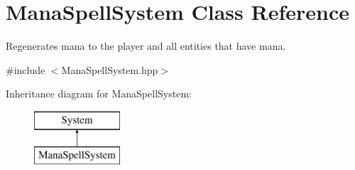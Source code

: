 \hypertarget{class_mana_spell_system}{}\section{Mana\+Spell\+System Class Reference}
\label{class_mana_spell_system}


Regenerates mana to the player and all entities that have mana.  




{\ttfamily \#include $<$Mana\+Spell\+System.\+hpp$>$}

Inheritance diagram for Mana\+Spell\+System\+:\begin{figure}[H]
\begin{center}
\leavevmode
\includegraphics[height=2.000000cm]{class_mana_spell_system}
\end{center}
\end{figure}
